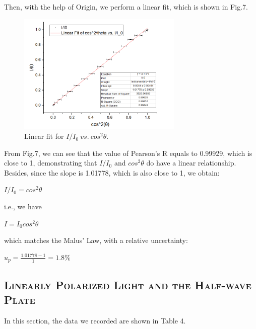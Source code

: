 \documentclass[a4paper,12pt]{article}
\begin{document}
\par Then, with the help of Origin, we perform a linear fit, which is shown in Fig.7. 

\begin{figure}[h] 
    \centering
    \includegraphics[width=0.7\textwidth]{R1} 
    \caption{Linear fit for $I/I_0~vs.~cos^2\theta$.} 
\end{figure}

From Fig.7, we can see that the value of Pearson's R equals to 0.99929, which is close to 1, demonstrating that $I/I_0$ and $cos^2\theta$ do have a linear relationship. Besides, since the slope is 1.01778, which is also close to 1, we obtain:
\begin{center}
$I/I_0 = cos^2\theta$
\end{center}
i.e., we have
\begin{center}
$I = I_0 cos^2\theta$
\end{center}
which matches the Malus' Law, with a relative uncertainty:
\begin{center}
$\displaystyle u_p = \frac{1.01778-1}{1} = 1.8\%$
\end{center}

\subsection{\textsc{Linearly Polarized Light and the Half-wave Plate}}
In this section, the data we recorded are shown in Table 4.
\end{document}
